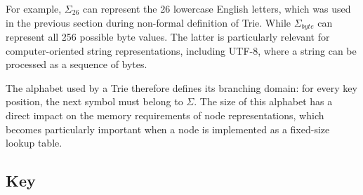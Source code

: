 \documentclass[11pt,twoside]{article}
\begin{document}
    \begin{table}[ht]
        \centering
        \setlength\tabcolsep{6pt}
        \caption{Examples of alphabets}
        \label{tab:alphabetExamples}
    \end{table}
    \noindent

    For example, \(\Sigma_{26}\) can represent the 26 lowercase English letters,
    which was used in the previous section
    during non-formal definition of Trie. While \(\Sigma_{byte}\) can represent
    all 256 possible byte values. The latter is particularly relevant for computer-oriented string representations,
    including UTF-8, where a string can be processed as a sequence of bytes.

    The alphabet used by a Trie therefore defines its branching domain: for every key position, the next symbol must belong
    to \(\Sigma\). The size of this alphabet has a direct impact on the memory requirements of node representations, which
    becomes particularly important when a node is implemented as a fixed-size lookup table.

    \subsection{Key}\label{key}
\end{document}
